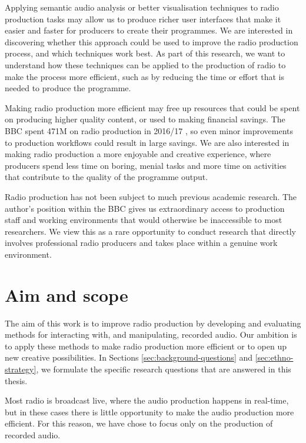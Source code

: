 Applying semantic audio analysis or better visualisation techniques to radio production tasks may allow us to produce
richer user interfaces that make it easier and faster for producers to create their programmes.  We are interested in
discovering whether this approach could be used to improve the radio production process, and which techniques work
best.  As part of this research, we want to understand how these techniques can be applied to the
production of radio to make the process more efficient, such as by reducing the time or effort that is needed to
produce the programme. 








Making radio production more efficient may free up resources that could be spent on producing higher quality content,
or used to making financial savings. The BBC spent \textsterling471M on radio production in 2016/17 \citep[p.
111]{Ofcom2017}, so even minor improvements to production workflows could result in large savings.  We are also interested
in making radio production a more enjoyable and creative experience, where producers spend less time on boring, menial
tasks and more time on activities that contribute to the quality of the programme output.

Radio production has not been subject to much previous academic research.  The author's position within the BBC gives
us extraordinary access to production staff and working environments that would otherwise be inaccessible to most
researchers. We view this as a rare opportunity to conduct research that directly involves professional radio producers
and takes place within a genuine work environment.


\section{Aim and scope}\label{sec:aim}

The aim of this work is to improve radio production by developing and evaluating methods for interacting with, and
manipulating, recorded audio.  Our ambition is to apply these methods to make radio production more efficient or to
open up new creative possibilities.  In Sections \ref{sec:background-questions} and \ref{sec:ethno-strategy}, we
formulate the specific research questions that are answered in this thesis.

Most radio is broadcast live, where the audio production happens in real-time, but in these cases there is little 
opportunity to make the audio production more efficient. For this reason, we have chose to focus only on the production
of recorded audio.

